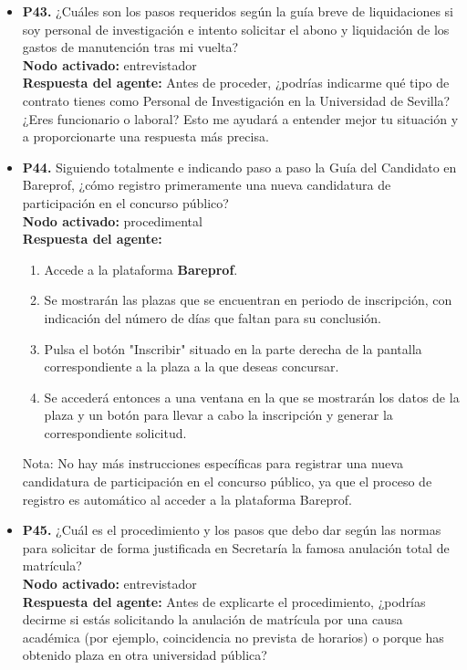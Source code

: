 \documentclass{article}
\begin{document}
\begin{itemize}
      \item \textbf{P43.} ¿Cuáles son los pasos requeridos según la guía breve de liquidaciones si soy personal de investigación e intento solicitar el abono y liquidación de los gastos de manutención tras mi vuelta? \\
            \textbf{Nodo activado:} entrevistador \\
            \textbf{Respuesta del agente:} Antes de proceder, ¿podrías indicarme qué tipo de contrato tienes como Personal de Investigación en la Universidad de Sevilla? ¿Eres funcionario o laboral? Esto me ayudará a entender mejor tu situación y a proporcionarte una respuesta más precisa.

      \item \textbf{P44.} Siguiendo totalmente e indicando paso a paso la Guía del Candidato en Bareprof, ¿cómo registro primeramente una nueva candidatura de participación en el concurso público? \\
            \textbf{Nodo activado:} procedimental \\
            \textbf{Respuesta del agente:} 
            \begin{enumerate}
                \item Accede a la plataforma \textbf{Bareprof}.
                \item Se mostrarán las plazas que se encuentran en periodo de inscripción, con indicación del número de días que faltan para su conclusión.
                \item Pulsa el botón "Inscribir" situado en la parte derecha de la pantalla correspondiente a la plaza a la que deseas concursar.
                \item Se accederá entonces a una ventana en la que se mostrarán los datos de la plaza y un botón para llevar a cabo la inscripción y generar la correspondiente solicitud.
            \end{enumerate}

            Nota: No hay más instrucciones específicas para registrar una nueva candidatura de participación en el concurso público, ya que el proceso de registro es automático al acceder a la plataforma Bareprof.

      \item \textbf{P45.} ¿Cuál es el procedimiento y los pasos que debo dar según las normas para solicitar de forma justificada en Secretaría la famosa anulación total de matrícula? \\
            \textbf{Nodo activado:} entrevistador \\
            \textbf{Respuesta del agente:} Antes de explicarte el procedimiento, ¿podrías decirme si estás solicitando la anulación de matrícula por una causa académica (por ejemplo, coincidencia no prevista de horarios) o porque has obtenido plaza en otra universidad pública?


\end{itemize}
\end{document}
